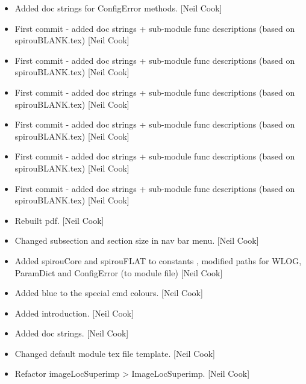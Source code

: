 \documentclass[a4paper,10pt,english]{report}
\begin{document}
\begin{itemize}
\item {} 
Added doc strings for ConfigError methods. {[}Neil Cook{]}

\item {} 
First commit - added doc strings + sub-module func descriptions (based
on spirouBLANK.tex) {[}Neil Cook{]}

\item {} 
First commit - added doc strings + sub-module func descriptions (based
on spirouBLANK.tex) {[}Neil Cook{]}

\item {} 
First commit - added doc strings + sub-module func descriptions (based
on spirouBLANK.tex) {[}Neil Cook{]}

\item {} 
First commit - added doc strings + sub-module func descriptions (based
on spirouBLANK.tex) {[}Neil Cook{]}

\item {} 
First commit - added doc strings + sub-module func descriptions (based
on spirouBLANK.tex) {[}Neil Cook{]}

\item {} 
First commit - added doc strings + sub-module func descriptions (based
on spirouBLANK.tex) {[}Neil Cook{]}

\item {} 
Rebuilt pdf. {[}Neil Cook{]}

\item {} 
Changed subsection and section size in nav bar menu. {[}Neil Cook{]}

\item {} 
Added spirouCore and spirouFLAT to constants , modified paths for
WLOG, ParamDict and ConfigError (to module file) {[}Neil Cook{]}

\item {} 
Added blue to the special cmd colours. {[}Neil Cook{]}

\item {} 
Added introduction. {[}Neil Cook{]}

\item {} 
Added doc strings. {[}Neil Cook{]}

\item {} 
Changed default module tex file template. {[}Neil Cook{]}

\item {} 
Refactor imageLocSuperimp \textendash{}\textgreater{} ImageLocSuperimp. {[}Neil Cook{]}

\end{itemize}
\end{document}
